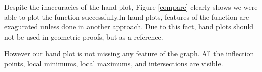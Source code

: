 Despite the inaccuracies of the hand plot, Figure \ref{compare} clearly
shows we were able to plot the function successfully.In hand plots,
features of the function are exagurated unless done in another
approach. Due to this fact, hand plots should not be used in geometric
proofs, but as a reference.

However our hand plot is not missing any feature of the graph. All the 
inflection points, local minimums, local maximums, and intersections are
visible.